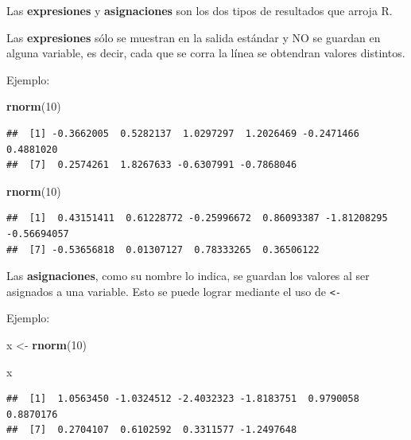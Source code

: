 \documentclass[
]{book}
\newenvironment{Shaded}{\begin{snugshade}}{\end{snugshade}}
\newcommand{\DecValTok}[1]{\textcolor[rgb]{0.00,0.00,0.81}{#1}}
\newcommand{\FunctionTok}[1]{\textcolor[rgb]{0.13,0.29,0.53}{\textbf{#1}}}
\newcommand{\NormalTok}[1]{#1}
\newcommand{\OtherTok}[1]{\textcolor[rgb]{0.56,0.35,0.01}{#1}}
\begin{document}
Las \textbf{expresiones} y \textbf{asignaciones} son los dos tipos de resultados que arroja R.

Las \textbf{expresiones} sólo se muestran en la salida estándar y NO se guardan en alguna variable, es decir, cada que se corra la línea se obtendran valores distintos.

Ejemplo:

\begin{Shaded}
\begin{Highlighting}[]
\FunctionTok{rnorm}\NormalTok{(}\DecValTok{10}\NormalTok{)}
\end{Highlighting}
\end{Shaded}

\begin{verbatim}
##  [1] -0.3662005  0.5282137  1.0297297  1.2026469 -0.2471466  0.4881020
##  [7]  0.2574261  1.8267633 -0.6307991 -0.7868046
\end{verbatim}

\begin{Shaded}
\begin{Highlighting}[]
\FunctionTok{rnorm}\NormalTok{(}\DecValTok{10}\NormalTok{)}
\end{Highlighting}
\end{Shaded}

\begin{verbatim}
##  [1]  0.43151411  0.61228772 -0.25996672  0.86093387 -1.81208295 -0.56694057
##  [7] -0.53656818  0.01307127  0.78333265  0.36506122
\end{verbatim}

Las \textbf{asignaciones}, como su nombre lo indica, se guardan los valores al ser asignados a una variable. Esto se puede lograr mediante el uso de \texttt{\textless{}-}

Ejemplo:

\begin{Shaded}
\begin{Highlighting}[]
\NormalTok{x }\OtherTok{\textless{}{-}} \FunctionTok{rnorm}\NormalTok{(}\DecValTok{10}\NormalTok{)}
\end{Highlighting}
\end{Shaded}

\begin{Shaded}
\begin{Highlighting}[]
\NormalTok{x}
\end{Highlighting}
\end{Shaded}

\begin{verbatim}
##  [1]  1.0563450 -1.0324512 -2.4032323 -1.8183751  0.9790058  0.8870176
##  [7]  0.2704107  0.6102592  0.3311577 -1.2497648
\end{verbatim}
\end{document}
